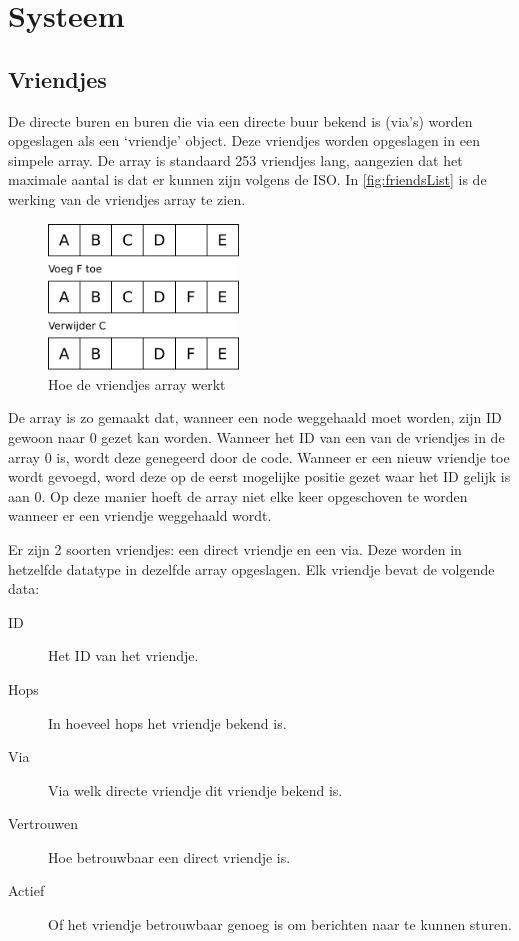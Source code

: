 \section{Systeem}



\subsection{Vriendjes}

De directe buren en buren die via een directe buur bekend is (via's) worden opgeslagen als een `vriendje' object. Deze vriendjes worden opgeslagen in een simpele array. De array is standaard 253 vriendjes lang, aangezien dat het maximale aantal is dat er kunnen zijn volgens de ISO. In \autoref{fig:friendsList} is de werking van de vriendjes array te zien.


\begin{figure}[ht]
    \centering
    \includegraphics[width=0.45\textwidth]{img/friendList.pdf}
    \caption{Hoe de vriendjes array werkt}
    \label{fig:friendsList}
\end{figure}

De array is zo gemaakt dat, wanneer een node weggehaald moet worden, zijn ID gewoon naar 0 gezet kan worden. Wanneer het ID van een van de vriendjes in de array 0 is, wordt deze genegeerd door de code. Wanneer er een nieuw vriendje toe wordt gevoegd, word deze op de eerst mogelijke positie gezet waar het ID gelijk is aan 0. Op deze manier hoeft de array niet elke keer opgeschoven te worden wanneer er een vriendje weggehaald wordt.

Er zijn 2 soorten vriendjes: een direct vriendje en een via. Deze worden in hetzelfde datatype in dezelfde array opgeslagen. Elk vriendje bevat de volgende data:
\begin{description}
    \item[ID]       Het ID van het vriendje.
    \item[Hops]     In hoeveel hops het vriendje bekend is.
    \item[Via]      Via welk directe vriendje dit vriendje bekend is.
    \item[Vertrouwen]    Hoe betrouwbaar een direct vriendje is.
    \item[Actief]   Of het vriendje betrouwbaar genoeg is om berichten naar te kunnen sturen.
\end{description}

